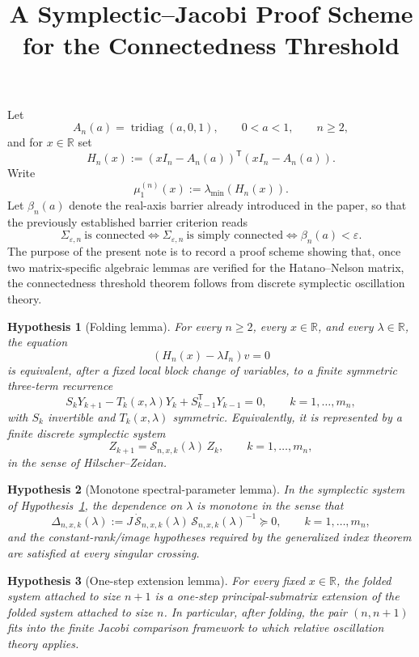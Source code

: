 \documentclass[11pt]{article}
\title{A Symplectic--Jacobi Proof Scheme for the Connectedness Threshold}
\author{}
\date{}
\numberwithin{equation}{section}
\newtheorem{hypothesis}{Hypothesis}
\begin{document}
\maketitle

Let
\[
A_n(a)=\operatorname{tridiag}(a,0,1),\qquad 0<a<1,\qquad n\ge 2,
\]
and for \(x\in\mathbb R\) set
\[
H_n(x):=(xI_n-A_n(a))^{\mathsf T}(xI_n-A_n(a)).
\]
Write
\[
\mu_1^{(n)}(x):=\lambda_{\min}(H_n(x)).
\]
Let \(\beta_n(a)\) denote the real-axis barrier already introduced in the paper, so that the
previously established barrier criterion reads
\[
\Sigma_{\varepsilon,n}\ \text{is connected}
\iff
\Sigma_{\varepsilon,n}\ \text{is simply connected}
\iff
\beta_n(a)<\varepsilon.
\]
The purpose of the present note is to record a proof scheme showing that, once two
matrix-specific algebraic lemmas are verified for the Hatano--Nelson matrix, the connectedness
threshold theorem follows from discrete symplectic oscillation theory.

\begin{hypothesis}[Folding lemma]\label{hyp:folding}
For every \(n\ge2\), every \(x\in\mathbb R\), and every \(\lambda\in\mathbb R\), the equation
\[
(H_n(x)-\lambda I_n)v=0
\]
is equivalent, after a fixed local block change of variables, to a finite symmetric three-term
recurrence
\[
S_kY_{k+1}-T_k(x,\lambda)Y_k+S_{k-1}^{\mathsf T}Y_{k-1}=0,
\qquad k=1,\dots,m_n,
\]
with \(S_k\) invertible and \(T_k(x,\lambda)\) symmetric. Equivalently, it is represented by a
finite discrete symplectic system
\[
Z_{k+1}=\mathcal S_{n,x,k}(\lambda)\,Z_k,
\qquad k=1,\dots,m_n,
\]
in the sense of Hilscher--Zeidan.
\end{hypothesis}

\begin{hypothesis}[Monotone spectral-parameter lemma]\label{hyp:monotone}
In the symplectic system of Hypothesis~\ref{hyp:folding}, the dependence on \(\lambda\) is
monotone in the sense that
\[
\Delta_{n,x,k}(\lambda)
:=J\,\dot{\mathcal S}_{n,x,k}(\lambda)\,\mathcal S_{n,x,k}(\lambda)^{-1}
\succeq 0,
\qquad k=1,\dots,m_n,
\]
and the constant-rank/image hypotheses required by the generalized index theorem are satisfied at
every singular crossing.
\end{hypothesis}

\begin{hypothesis}[One-step extension lemma]\label{hyp:extension}
For every fixed \(x\in\mathbb R\), the folded system attached to size \(n+1\) is a one-step
principal-submatrix extension of the folded system attached to size \(n\). In particular, after
folding, the pair \((n,n+1)\) fits into the finite Jacobi comparison framework to which relative
oscillation theory applies.
\end{hypothesis}
\end{document}
